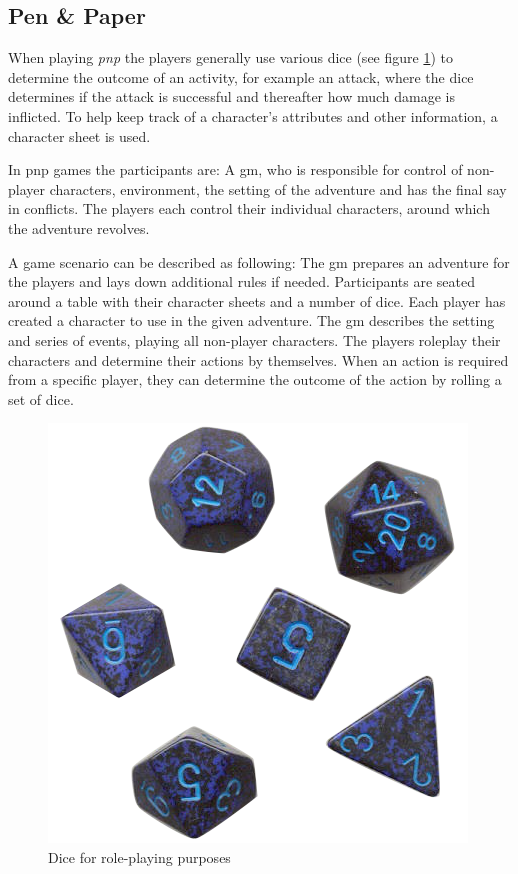 \subsection{Pen \& Paper}
When playing \emph{\ac{pnp}} the players generally use various dice (see figure \ref{dice}) to determine the outcome of an activity, for example an attack, where the dice determines if the attack is successful and thereafter how much damage is inflicted. To help keep track of a character's attributes and other information, a character sheet is used.

In \ac{pnp} games the participants are: A \ac{gm}, who is responsible for control of non-player characters, environment, the setting of the adventure and has the final say in conflicts. The players each control their individual characters, around which the adventure revolves.

A game scenario can be described as following: The \ac{gm} prepares an adventure for the players and lays down additional rules if needed. Participants are seated around a table with their character sheets and a number of dice. Each player has created a character to use in the given adventure. The \ac{gm} describes the setting and series of events, playing all non-player characters. The players roleplay their characters and determine their actions by themselves. When an action is required from a specific player, they can determine the outcome of the action by rolling a set of dice.
\begin{figure}[!h]
\centering
\includegraphics[scale=0.35]{img/rpgdice.png}
\caption{Dice for role-playing purposes}
\label{dice}
\end{figure}

